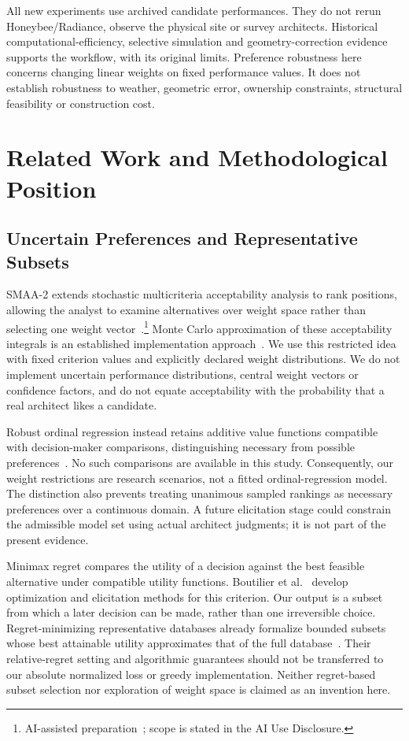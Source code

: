\documentclass{llncs}
\newcommand{\aidraft}{\footnote{AI-assisted preparation~\cite{openai2026}; scope is stated in the AI Use Disclosure.}}
\begin{document}
All new experiments use archived candidate performances. They do not rerun Honeybee/Radiance, observe the physical site or survey architects. Historical computational-efficiency, selective simulation and geometry-correction evidence supports the workflow, with its original limits. Preference robustness here concerns changing linear weights on fixed performance values. It does not establish robustness to weather, geometric error, ownership constraints, structural feasibility or construction cost.

\section{Related Work and Methodological Position}
\subsection{Uncertain Preferences and Representative Subsets}
SMAA-2 extends stochastic multicriteria acceptability analysis to rank positions, allowing the analyst to examine alternatives over weight space rather than selecting one weight vector~\cite{LahdelmaSalminen2001}.\aidraft{} Monte Carlo approximation of these acceptability integrals is an established implementation approach~\cite{TervonenLahdelma2007}. We use this restricted idea with fixed criterion values and explicitly declared weight distributions. We do not implement uncertain performance distributions, central weight vectors or confidence factors, and do not equate acceptability with the probability that a real architect likes a candidate.

Robust ordinal regression instead retains additive value functions compatible with decision-maker comparisons, distinguishing necessary from possible preferences~\cite{GrecoMousseauSlowinski2008}. No such comparisons are available in this study. Consequently, our weight restrictions are research scenarios, not a fitted ordinal-regression model. The distinction also prevents treating unanimous sampled rankings as necessary preferences over a continuous domain. A future elicitation stage could constrain the admissible model set using actual architect judgments; it is not part of the present evidence.

Minimax regret compares the utility of a decision against the best feasible alternative under compatible utility functions. Boutilier et al.~\cite{BoutilierEtAl2006} develop optimization and elicitation methods for this criterion. Our output is a subset from which a later decision can be made, rather than one irreversible choice. Regret-minimizing representative databases already formalize bounded subsets whose best attainable utility approximates that of the full database~\cite{NanongkaiEtAl2010}. Their relative-regret setting and algorithmic guarantees should not be transferred to our absolute normalized loss or greedy implementation. Neither regret-based subset selection nor exploration of weight space is claimed as an invention here.
\end{document}
